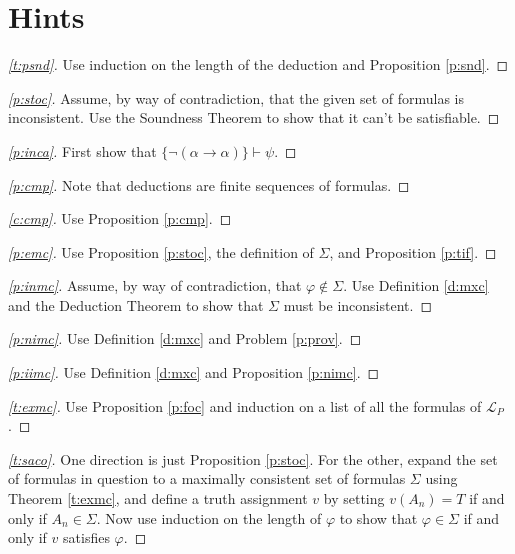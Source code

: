 \documentclass[12pt]{amsbook}
\newcommand{\proves}{\vdash}
\theoremstyle{plain}
\theoremstyle{definition}
\theoremstyle{remark}
\newenvironment{clue}[1]%
{\begin{proof}[\ref{#1}]}%
{\renewcommand{\qed}{}\end{proof}}
\begin{document}
\chapter{Hints}


\begin{clue}{t:psnd}
Use induction on the length of the deduction and Proposition \ref{p:snd}.
\end{clue}

\begin{clue}{p:stoc}
Assume,  by way of contradiction,  that the given set of formulas is inconsistent.  Use the Soundness Theorem to show that it can't be satisfiable.
\end{clue}

\begin{clue}{p:inca}
First show that $\{ \lnot(\alpha \to \alpha) \} \proves \psi$.
\end{clue}

\begin{clue}{p:cmp}
Note that deductions are finite sequences of formulas.
\end{clue}

\begin{clue}{c:cmp}
Use Proposition \ref{p:cmp}.
\end{clue}

\begin{clue}{p:emc}
Use Proposition \ref{p:stoc},  the definition of $\Sigma$,  and Proposition \ref{p:tif}.
\end{clue}

\begin{clue}{p:inmc}
Assume,  by way of contradiction,  that $\varphi \notin \Sigma$.  Use Definition \ref{d:mxc} and the Deduction Theorem to show that $\Sigma$ must be inconsistent.
\end{clue}

\begin{clue}{p:nimc}
Use Definition \ref{d:mxc} and Problem \ref{p:prov}.
\end{clue}

\begin{clue}{p:iimc}
Use Definition \ref{d:mxc} and Proposition \ref{p:nimc}.
\end{clue}

\begin{clue}{t:exmc}
Use Proposition \ref{p:foc} and induction on a list of all the formulas of $\mathcal{L}_P$.
\end{clue}

\begin{clue}{t:saco}
One direction is just Proposition \ref{p:stoc}.  For the other,  expand the set of formulas in question to a maximally consistent set of formulas $\Sigma$ using Theorem \ref{t:exmc},  and define a truth assignment $v$ by setting $v(A_n) = T$ if and only if $A_n \in \Sigma$.  Now use induction on the length of $\varphi$ to show that $\varphi \in \Sigma$ if and only if $v$ satisfies $\varphi$.
\end{clue}
\end{document}
